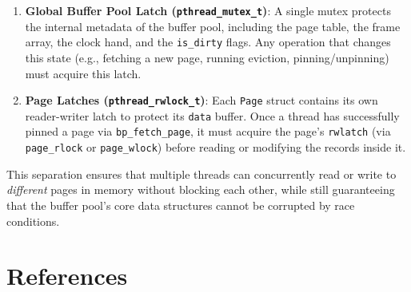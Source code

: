 \documentclass[12pt, a4paper]{report}
\begin{document}
\begin{enumerate}[itemsep=4pt]
    \item \textbf{Global Buffer Pool Latch (\texttt{pthread\_mutex\_t})}: A single mutex protects the internal metadata of the buffer pool, including the page table, the frame array, the clock hand, and the \texttt{is\_dirty} flags. Any operation that changes this state (e.g., fetching a new page, running eviction, pinning/unpinning) must acquire this latch.
    \item \textbf{Page Latches (\texttt{pthread\_rwlock\_t})}: Each \texttt{Page} struct contains its own reader-writer latch to protect its \texttt{data} buffer. Once a thread has successfully pinned a page via \texttt{bp\_fetch\_page}, it must acquire the page's \texttt{rwlatch} (via \texttt{page\_rlock} or \texttt{page\_wlock}) before reading or modifying the records inside it.
\end{enumerate}

This separation ensures that multiple threads can concurrently read or write to \textit{different} pages in memory without blocking each other, while still guaranteeing that the buffer pool's core data structures cannot be corrupted by race conditions.


\section{References}
\end{document}
